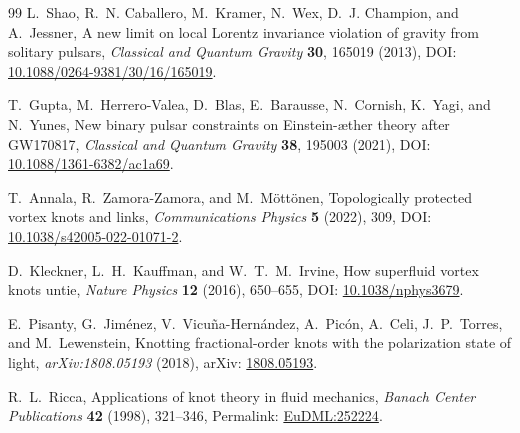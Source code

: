 \documentclass[11pt]{article}
\theoremstyle{definition}
\theoremstyle{plain}
\theoremstyle{remark}
\begin{document}
\begin{thebibliography}{99}
            L.~Shao, R.~N. Caballero, M.~Kramer, N.~Wex, D.~J. Champion, and A.~Jessner,
            \newblock A new limit on local Lorentz invariance violation of gravity from solitary pulsars,
            \newblock \emph{Classical and Quantum Gravity} \textbf{30}, 165019 (2013),
            \newblock DOI: \href{https://doi.org/10.1088/0264-9381/30/16/165019}{10.1088/0264-9381/30/16/165019}.

            T.~Gupta, M.~Herrero-Valea, D.~Blas, E.~Barausse, N.~Cornish, K.~Yagi, and N.~Yunes,
            \newblock New binary pulsar constraints on Einstein-\ae ther theory after GW170817,
            \newblock \emph{Classical and Quantum Gravity} \textbf{38}, 195003 (2021),
            \newblock DOI: \href{https://doi.org/10.1088/1361-6382/ac1a69}{10.1088/1361-6382/ac1a69}.

            T.~Annala, R.~Zamora-Zamora, and M.~M{\"o}tt{\"o}nen,
            \newblock Topologically protected vortex knots and links,
            \newblock \emph{Communications Physics} \textbf{5} (2022), 309,
            \newblock DOI: \href{https://doi.org/10.1038/s42005-022-01071-2}{10.1038/s42005-022-01071-2}.

            D.~Kleckner, L.~H.~Kauffman, and W.~T.~M.~Irvine,
            \newblock How superfluid vortex knots untie,
            \newblock \emph{Nature Physics} \textbf{12} (2016), 650--655,
            \newblock DOI: \href{https://doi.org/10.1038/nphys3679}{10.1038/nphys3679}.

            E.~Pisanty, G.~Jim{\'e}nez, V.~Vicu{\~n}a-Hern{\'a}ndez, A.~Pic{\'o}n, A.~Celi, J.~P.~Torres, and M.~Lewenstein,
            \newblock Knotting fractional-order knots with the polarization state of light,
            \newblock \emph{arXiv:1808.05193} (2018),
            \newblock arXiv: \href{https://arxiv.org/abs/1808.05193}{1808.05193}.

            R.~L.~Ricca,
            \newblock Applications of knot theory in fluid mechanics,
            \newblock \emph{Banach Center Publications} \textbf{42} (1998), 321--346,
            \newblock Permalink: \href{https://eudml.org/doc/252224}{EuDML:252224}.

        \end{thebibliography}
\end{document}
